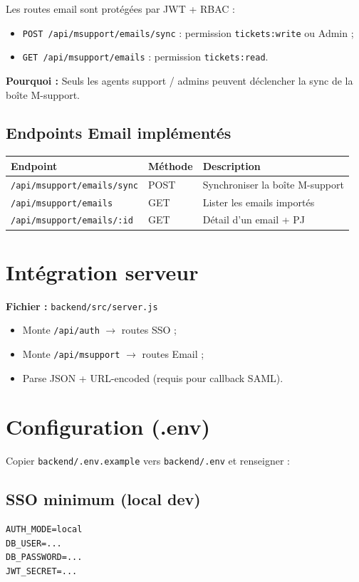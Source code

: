 \documentclass[12pt,a4paper]{article}
\begin{document}
Les routes email sont protégées par JWT + RBAC :
\begin{itemize}
  \item \texttt{POST /api/msupport/emails/sync} : permission \texttt{tickets:write} ou Admin ;
  \item \texttt{GET /api/msupport/emails} : permission \texttt{tickets:read}.
\end{itemize}

\textbf{Pourquoi :} Seuls les agents support / admins peuvent déclencher la sync de la boîte M-support.

\subsection{Endpoints Email implémentés}

\begin{tabular}{@{}lll@{}}
\toprule
Endpoint & Méthode & Description \\
\midrule
\texttt{/api/msupport/emails/sync} & POST & Synchroniser la boîte M-support \\
\texttt{/api/msupport/emails} & GET & Lister les emails importés \\
\texttt{/api/msupport/emails/:id} & GET & Détail d'un email + PJ \\
\bottomrule
\end{tabular}

\newpage
\section{Intégration serveur}

\textbf{Fichier :} \texttt{backend/src/server.js}

\begin{itemize}
  \item Monte \texttt{/api/auth} $\rightarrow$ routes SSO ;
  \item Monte \texttt{/api/msupport} $\rightarrow$ routes Email ;
  \item Parse JSON + URL-encoded (requis pour callback SAML).
\end{itemize}

\section{Configuration (.env)}

Copier \texttt{backend/.env.example} vers \texttt{backend/.env} et renseigner :

\subsection{SSO minimum (local dev)}
\begin{lstlisting}
AUTH_MODE=local
DB_USER=...
DB_PASSWORD=...
JWT_SECRET=...
\end{lstlisting}
\end{document}
